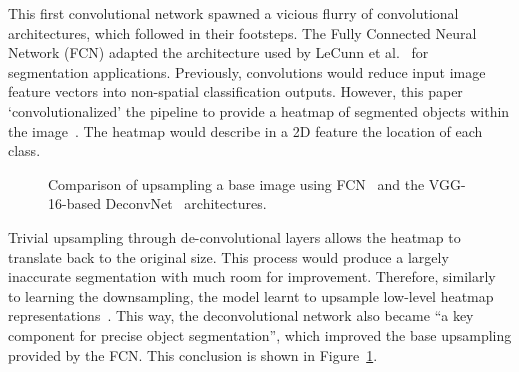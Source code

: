 \documentclass[11pt,twoside]{report}
\begin{document}
This first convolutional network spawned a vicious flurry of convolutional architectures, which followed in their footsteps. The Fully Connected Neural Network (FCN) adapted the architecture used by LeCunn et al.~\cite{Lenet1998} for segmentation applications. Previously, convolutions would reduce input image feature vectors into non-spatial classification outputs. However, this paper `convolutionalized' the pipeline to provide a heatmap of segmented objects within the image~\cite{fully-CNNs-for-semantic-segmentation}. The heatmap would describe in a 2D feature the location of each class.

\begin{figure}[H]
  \centering
  \caption{Comparison of upsampling a base image using FCN~\cite{fully-CNNs-for-semantic-segmentation} and the VGG-16-based DeconvNet~\cite{noh2015learning, simonyan2014very} architectures.}\label{fig:fcn-vs-deconvnet}
\end{figure}

Trivial upsampling through de-convolutional layers allows the heatmap to translate back to the original size. This process would produce a largely inaccurate segmentation with much room for improvement. Therefore, similarly to learning the downsampling, the model learnt to upsample low-level heatmap representations~\cite{noh2015learning}. This way, the deconvolutional network also became ``a key component for precise object segmentation'', which improved the base upsampling provided by the FCN. This conclusion is shown in Figure~\ref{fig:fcn-vs-deconvnet}.
\end{document}
